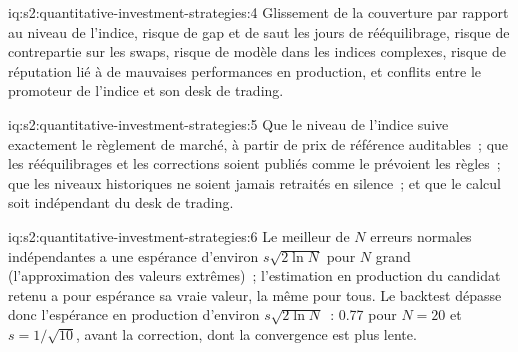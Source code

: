 \begin{solution}{iq:s2:quantitative-investment-strategies:4}
Glissement de la couverture par rapport au niveau de l'indice, risque de gap et de saut les jours de rééquilibrage, risque de contrepartie sur les swaps, risque de modèle dans les indices complexes,
risque de réputation lié à de mauvaises performances en production, et conflits entre le promoteur de l'indice et son desk de trading.
\end{solution}

\begin{solution}{iq:s2:quantitative-investment-strategies:5}
Que le niveau de l'indice suive exactement le règlement de marché, à partir de prix de référence auditables~; que les rééquilibrages et les corrections soient publiés comme le prévoient les règles~;
que les niveaux historiques ne soient jamais retraités en silence~; et que le calcul soit indépendant du desk de trading.
\end{solution}

\begin{solution}{iq:s2:quantitative-investment-strategies:6}
Le meilleur de $N$ erreurs normales indépendantes a une espérance d'environ $s\sqrt{2\ln N}$ pour $N$ grand (l'approximation des valeurs extrêmes)~; l'estimation en production
du candidat retenu a pour espérance sa vraie valeur, la même pour tous. Le backtest dépasse donc l'espérance en production d'environ
$s\sqrt{2\ln N}$~: 0.77 pour $N = 20$ et $s = 1/\sqrt{10}$, avant la correction, dont la convergence est plus lente.
\end{solution}
